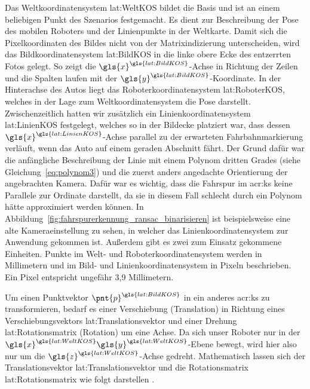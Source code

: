 Das Weltkoordinatensystem \gls{lat:WeltKOS} bildet die Basis und ist an einem beliebigen Punkt des Szenarios festgemacht. Es dient zur Beschreibung der Pose des mobilen Roboters und der Linienpunkte in der Weltkarte. Damit sich die Pixelkoordinaten des Bildes nicht von der Matrixindizierung unterscheiden, wird das Bildkoordinatensystem \gls{lat:BildKOS} in die linke obere Ecke des entzerrten Fotos gelegt. So zeigt die \( {\gls{x}}^{\gls{lat:BildKOS}} \)-Achse in Richtung der Zeilen und die Spalten laufen mit der \( {\gls{y}}^{\gls{lat:BildKOS}} \)-Koordinate. In der Hinterachse des Autos liegt das Roboterkoordinatensystem \gls{lat:RoboterKOS}, welches in der Lage zum Weltkoordinatensystem die Pose darstellt. Zwischenzeitlich hatten wir zusätzlich ein Linienkoordinatensystem \gls{lat:LinienKOS} festgelegt, welches so in der Bildecke platziert war, dass dessen \( {\gls{x}}^{\gls{lat:LinienKOS}} \)-Achse parallel zu der erwarteten Fahrbahnmarkierung verläuft, wenn das Auto auf einem geraden Abschnitt fährt. Der Grund dafür war die anfängliche Beschreibung der Linie mit einem Polynom dritten Grades (siehe Gleichung~\ref{eq:polynom3}) und die zuerst anders angedachte Orientierung der angebrachten Kamera. Dafür war es wichtig, dass die Fahrspur im \gls{acr:ks} keine Parallele zur Ordinate darstellt, da sie in diesem Fall schlecht durch ein Polynom hätte approximiert werden können. In Abbildung~\ref{fig:fahrspurerkennung_ransac_binarisieren} ist beispielsweise eine alte Kameraeinstellung zu sehen, in welcher das Linienkoordinatensystem zur Anwendung gekommen ist. Außerdem gibt es zwei zum Einsatz gekommene Einheiten. Punkte im Welt- und Roboterkoordinatensystem werden in Millimetern und im Bild- und Linienkoordinatensystem in Pixeln beschrieben. Ein Pixel entspricht ungefähr 3,9 Millimetern.

Um einen Punktvektor \( \pnt{p}^{\gls{lat:BildKOS}} \) in ein anderes \gls{acr:ks} zu transformieren, bedarf es einer Verschiebung (Translation) in Richtung eines Verschiebungsvektors \gls{lat:Translationsvektor} und einer Drehung \gls{lat:Rotationsmatrix} (Rotation) um eine Achse. Da sich unser Roboter nur in der \(  \gls{x}^{\gls{lat:WeltKOS}} \gls{y}^{\gls{lat:WeltKOS}} \)-Ebene bewegt, wird hier also nur um die \( \gls{z}^{\gls{lat:WeltKOS}} \)-Achse gedreht.  
Mathematisch lassen sich der Translationsvektor \gls{lat:Translationsvektor} und die Rotationsmatrix \gls{lat:Rotationsmatrix} wie folgt darstellen \autocite{bajdRobotics2010}.

